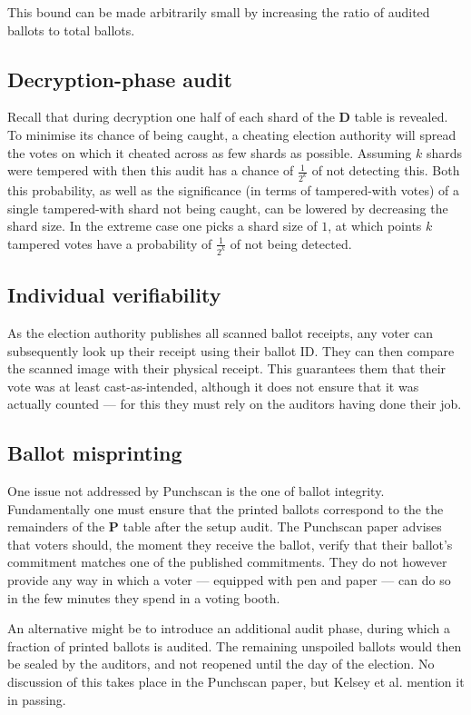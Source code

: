 This bound can be made arbitrarily small by increasing the ratio of audited
ballots to total ballots.

\subsection{Decryption-phase audit}

Recall that during decryption one half of each shard of the \textbf{D} table is
revealed. To minimise its chance of being caught, a cheating election authority
will spread the votes on which it cheated across as few shards as possible.
Assuming $k$ shards were tempered with then this audit has a chance of
$\frac{1}{2^k}$ of not detecting this. Both this probability, as well as the
significance (in terms of tampered-with votes) of a single tampered-with shard
not being caught, can be lowered by decreasing the shard size. In the extreme
case one picks a shard size of $1$, at which points $k$ tampered votes have a
probability of $\frac{1}{2^k}$ of not being detected.

\subsection{Individual verifiability}

As the election authority publishes all scanned ballot receipts, any voter can
subsequently look up their receipt using their ballot ID. They can then compare
the scanned image with their physical receipt. This guarantees them that their
vote was at least cast-as-intended, although it does not ensure that it was
actually counted --- for this they must rely on the auditors having done their
job.

\subsection{Ballot misprinting}

One issue not addressed by Punchscan is the one of ballot integrity.
Fundamentally one must ensure that the printed ballots correspond to the the
remainders of the \textbf{P} table after the setup audit. The Punchscan paper
advises that voters should, the moment they receive the ballot, verify that
their ballot's commitment matches one of the published commitments. They do not
however provide any way in which a voter --- equipped with pen and paper ---
can do so in the few minutes they spend in a voting booth.

An alternative might be to introduce an additional audit phase, during which a
fraction of printed ballots is audited. The remaining unspoiled ballots would
then be sealed by the auditors, and not reopened until the day of the election.
No discussion of this takes place in the Punchscan paper, but Kelsey et
al.\autocite{kelseyAttackingPaperBasedE2E2010} mention it in passing.

